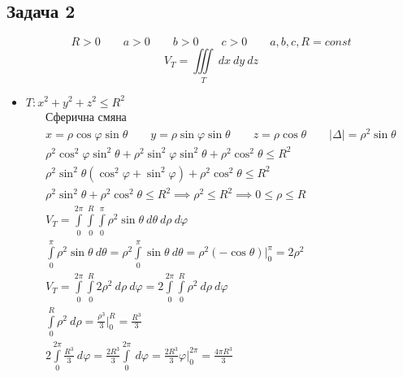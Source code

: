 \documentclass[a4paper,fleqn,12pt]{article}
\theoremstyle{definition}
\begin{document}
\subsection*{Задача 2}
$$R>0 \qquad a>0 \qquad b>0 \qquad c > 0 \qquad  a,b,c,R = const$$
$$V_T = \iiint\limits_{T} \ dx \ dy \ dz $$
\begin{itemize}
\item $T: x^2 + y^2 + z^2 \leq R^2$\\
\begin{gather*}
\text{Сферична смяна} \\
x = \rho \cos \varphi \sin \theta \qquad 
y = \rho \sin \varphi \sin \theta \qquad  
z = \rho \cos \theta \qquad 
|\Delta| = \rho^2 \sin \theta \\
\rho^2 \cos^2 \varphi \sin^2 \theta + \rho^2 \sin^2 \varphi \sin^2 \theta + \rho^2 \cos^2 \theta \leq R^2 \\
\rho^2 \sin^2 \theta (\cos^2 \varphi + \sin^2 \varphi) + \rho^2 \cos^2 \theta \leq R^2 \\
\rho^2 \sin^2 \theta + \rho^2 \cos^2 \theta \leq R^2 \implies \rho^2 \leq R^2 \implies 0 \leq \rho \leq R \\
V_T = \int\limits_0 ^{2\pi} \int\limits_0 ^{R} \int\limits_0 ^{\pi} \rho^2 \sin \theta \ d \theta \ d \rho \ d \varphi \\
\int\limits_0 ^{\pi} \rho^2 \sin \theta \ d \theta = 
\rho^2 \int\limits_0 ^{\pi} \sin \theta \ d \theta = 
\rho^2 (- \cos \theta)\Big|_0 ^{\pi} = 2 \rho^2 \\
V_T =  \int\limits_0 ^{2\pi} \int\limits_0 ^{R}  2 \rho^2 \ d \rho \ d \varphi =
2 \int\limits_0 ^{2\pi} \int\limits_0 ^{R} \rho^2 \ d \rho \ d \varphi \\
\int\limits_0 ^{R} \rho^2 \ d \rho = \frac{\rho^3}{3} \Big|_0 ^{R} = \frac{R^3}{3} \\
2 \int\limits_0 ^{2\pi}  \frac{R^3}{3} \ d \varphi = 
\frac{2R^3}{3} \int\limits_0 ^{2\pi} \ d \varphi = \frac{2R^3}{3} \varphi \Big|_0 ^{2\pi} = \frac{4\pi R^3}{3}
\end{gather*}


\end{itemize}
\end{document}
